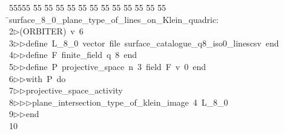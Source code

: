 %
%
\begin{tabbing}
55555 \= 55 \= 55 \= 55 \= 55 \= 55 \= 55 \= 55 \= 55 \= 55 \= 55 \= 55 \= 55 \= \>surface\_8\_0\_plane\_type\_of\_lines\_on\_Klein\_quadric:\\[0pt]
2\>$\triangleright$\>(ORBITER)\ v\ 6\ \\[0pt]
3\>$\triangleright$\>$\triangleright$\>define\ L\_8\_0\ vector\ file\ surface\_catalogue\_q8\_iso0\_linescsv\ end\ \\[0pt]
4\>$\triangleright$\>$\triangleright$\>define\ F\ finite\_field\ q\ 8\ end\ \\[0pt]
5\>$\triangleright$\>$\triangleright$\>define\ P\ projective\_space\ n\ 3\ field\ F\ v\ 0\ end\ \\[0pt]
6\>$\triangleright$\>$\triangleright$\>with\ P\ do\ \\[0pt]
7\>$\triangleright$\>$\triangleright$\>projective\_space\_activity\ \\[0pt]
8\>$\triangleright$\>$\triangleright$\>$\triangleright$\>plane\_intersection\_type\_of\_klein\_image\ 4\ L\_8\_0\ \\[0pt]
9\>$\triangleright$\>$\triangleright$\>end\ \\[0pt]
10\>\end{tabbing}
